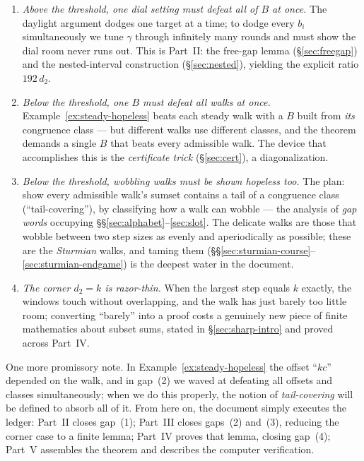 \documentclass[11pt,reqno]{amsart}
\theoremstyle{plain}
\theoremstyle{definition}
\theoremstyle{remark}
\begin{document}
\begin{enumerate}
\item \emph{Above the threshold, one dial setting must defeat all of $B$ at once.}
      The daylight argument dodges one target at a time; to dodge every $b_i$
      simultaneously we tune $\gamma$ through infinitely many rounds and must show the
      dial room never runs out. This is Part~II: the free-gap lemma
      (\S\ref{sec:freegap}) and the nested-interval construction
      (\S\ref{sec:nested}), yielding the explicit ratio $192\,d_2$.
\item \emph{Below the threshold, one $B$ must defeat all walks at once.}
      Example~\ref{ex:steady-hopeless} beats each steady walk with a $B$ built from
      \emph{its} congruence class --- but different walks use different classes, and
      the theorem demands a single $B$ that beats every admissible walk. The device
      that accomplishes this is the \emph{certificate trick} (\S\ref{sec:cert}), a
      diagonalization.
\item \emph{Below the threshold, wobbling walks must be shown hopeless too.} The plan:
      show every admissible walk's sumset contains a tail of a congruence class
      (``tail-covering''), by classifying how a walk can wobble --- the analysis of
      \emph{gap words} occupying \S\S\ref{sec:alphabet}--\ref{sec:slot}. The delicate
      walks are those that wobble between two step sizes as evenly and aperiodically
      as possible; these are the \emph{Sturmian} walks, and taming them
      (\S\S\ref{sec:sturmian-course}--\ref{sec:sturmian-endgame}) is the deepest water
      in the document.
\item \emph{The corner $d_2 = k$ is razor-thin.} When the largest step equals $k$
      exactly, the windows touch without overlapping, and the walk has just barely too
      little room; converting ``barely'' into a proof costs a genuinely new piece of
      finite mathematics about subset sums, stated in \S\ref{sec:sharp-intro} and
      proved across Part~IV.
\end{enumerate}

One more promissory note. In Example~\ref{ex:steady-hopeless} the offset ``$kc$''
depended on the walk, and in gap~(2) we waved at defeating all offsets and classes
simultaneously; when we do this properly, the notion of \emph{tail-covering} will be
defined to absorb all of it. From here on, the document simply executes the ledger:
Part~II closes gap~(1); Part~III closes gaps~(2) and~(3), reducing the corner case to
a finite lemma; Part~IV proves that lemma, closing gap~(4); Part~V assembles the
theorem and describes the computer verification.
\end{document}
